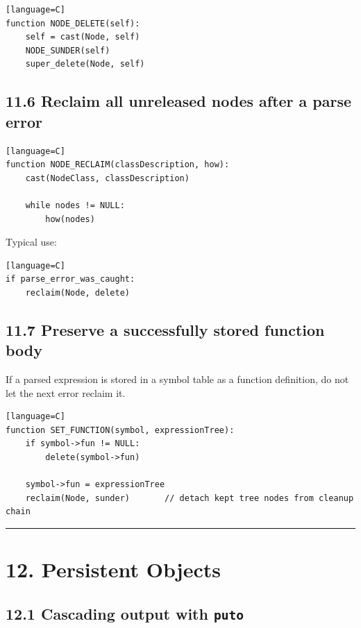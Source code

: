 \documentclass[11pt]{article}
\begin{document}
\begin{verbatim}[language=C]
function NODE_DELETE(self):
    self = cast(Node, self)
    NODE_SUNDER(self)
    super_delete(Node, self)
\end{verbatim}

\subsection{11.6 Reclaim all unreleased nodes after a parse
error}\label{reclaim-all-unreleased-nodes-after-a-parse-error}

\begin{verbatim}[language=C]
function NODE_RECLAIM(classDescription, how):
    cast(NodeClass, classDescription)

    while nodes != NULL:
        how(nodes)
\end{verbatim}

Typical use:

\begin{verbatim}[language=C]
if parse_error_was_caught:
    reclaim(Node, delete)
\end{verbatim}

\subsection{11.7 Preserve a successfully stored function
body}\label{preserve-a-successfully-stored-function-body}

If a parsed expression is stored in a symbol table as a function
definition, do not let the next error reclaim it.

\begin{verbatim}[language=C]
function SET_FUNCTION(symbol, expressionTree):
    if symbol->fun != NULL:
        delete(symbol->fun)

    symbol->fun = expressionTree
    reclaim(Node, sunder)       // detach kept tree nodes from cleanup chain
\end{verbatim}

\begin{center}\rule{0.5\linewidth}{0.5pt}\end{center}

\section{12. Persistent Objects}\label{persistent-objects}

\subsection{\texorpdfstring{12.1 Cascading output with
\texttt{puto}}{12.1 Cascading output with puto}}\label{cascading-output-with-puto}
\end{document}

